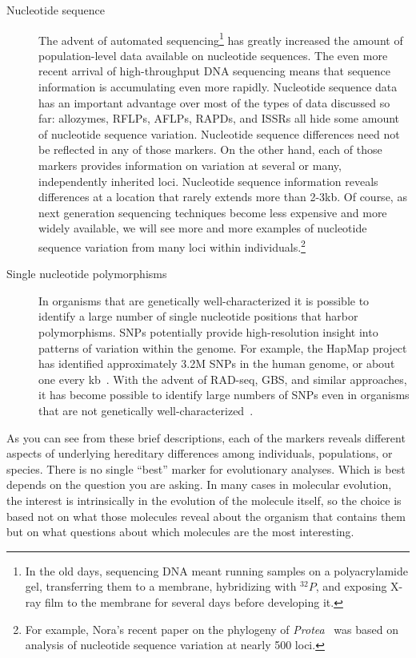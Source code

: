 \documentclass[12pt]{article}
\begin{document}
\begin{description}
\item[Nucleotide sequence] The advent of automated
  sequencing\footnote{In the old days, sequencing DNA meant running
    samples on a polyacrylamide gel, transferring them to a membrane,
    hybridizing with $^{32}P$, and exposing X-ray film to the membrane
    for several days before developing it.} has greatly increased the
  amount of population-level data available on nucleotide
  sequences. The even more recent arrival of high-throughput DNA
  sequencing means that sequence information is accumulating even more
  rapidly. Nucleotide sequence data has an important advantage over
  most of the types of data discussed so far: allozymes, RFLPs, AFLPs,
  RAPDs, and ISSRs all hide some amount of nucleotide sequence
  variation. Nucleotide sequence differences need not be reflected in
  any of those markers. On the other hand, each of those markers
  provides information on variation at several or many, independently
  inherited loci. Nucleotide sequence information reveals differences
  at a location that rarely extends more than 2-3kb. Of course, as
  next generation sequencing techniques become less expensive and more
  widely available, we will see more and more examples of nucleotide
  sequence variation from many loci within individuals.\footnote{For
    example, Nora's recent paper on the phylogeny of {\it
      Protea\/}~\cite{Mitchell-etal-2017} was based on analysis of
    nucleotide sequence variation at nearly 500 loci.}

\item[Single nucleotide polymorphisms] In organisms that are
  genetically well-characterized it is possible to identify a large
  number of single nucleotide positions that harbor
  polymorphisms. SNPs potentially provide high-resolution insight into
  patterns of variation within the genome. For example, the HapMap
  project has identified approximately 3.2M SNPs in the human genome,
  or about one every kb~\cite{HapMap-2007}. With the advent of
  RAD-seq, GBS, and similar approaches, it has become possible to
  identify large numbers of SNPs even in organisms that are not
  genetically
  well-characterized~\cite{Elshire-etal-2011,McKinney-etal-2017}.

\end{description}

As you can see from these brief descriptions, each of the markers
reveals different aspects of underlying hereditary differences among
individuals, populations, or species. There is no single ``best''
marker for evolutionary analyses. Which is best depends on the
question you are asking. In many cases in molecular evolution, the
interest is intrinsically in the evolution of the molecule itself, so
the choice is based not on what those molecules reveal about the
organism that contains them but on what questions about which
molecules are the most interesting.
\end{document}
